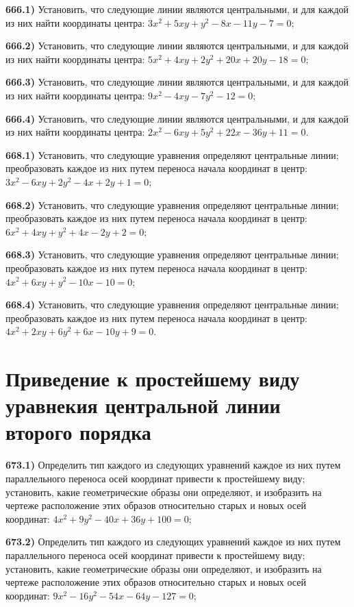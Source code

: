 \textbf{666.1)} Установить, что следующие линии являются центральными, и для каждой из них найти координаты центра: $3 x^2+5 x y+y^2-8 x-11 y-7=0$;

\textbf{666.2)} Установить, что следующие линии являются центральными, и для каждой из них найти координаты центра: $5 x^2+4 x y+2 y^2+20 x+20 y-18=0$;

\textbf{666.3)} Установить, что следующие линии являются центральными, и для каждой из них найти координаты центра: $9 x^2-4 x y-7 y^2-12=0$;

\textbf{666.4)} Установить, что следующие линии являются центральными, и для каждой из них найти координаты центра: $2 x^2-6 x y+5 y^2+22 x-36 y+11=0$.

\textbf{668.1)} Установить, что следующие уравнения определяют центральные линии; преобразовать каждое из них путем переноса начала координат в центр: $3 x^2-6 x y+2 y^2-4 x+2 y+1=0$;

\textbf{668.2)} Установить, что следующие уравнения определяют центральные линии; преобразовать каждое из них путем переноса начала координат в центр: $6 x^2+4 x y+y^2+4 x-2 y+2=0$;

\textbf{668.3)} Установить, что следующие уравнения определяют центральные линии; преобразовать каждое из них путем переноса начала координат в центр: $4 x^2+6 x y+y^2-10 x-10=0$;

\textbf{668.4)} Установить, что следующие уравнения определяют центральные линии; преобразовать каждое из них путем переноса начала координат в центр: $4 x^2+2 x y+6 y^2+6 x-10 y+9=0$.



\section{Приведение к простейшему виду уравнекия центральной линии второго порядка}



\textbf{673.1)} Определить тип каждого из следующих уравнений каждое из них путем параллельного переноса осей координат привести к простейшему виду; установить, какие геометрические образы они определяют, и изобразить на чертеже расположение этих образов относительно старых и новых осей координат: $4 x^2+9 y^2-40 x+36 y+100=0$;

\textbf{673.2)} Определить тип каждого из следующих уравнений каждое из них путем параллельного переноса осей координат привести к простейшему виду; установить, какие геометрические образы они определяют, и изобразить на чертеже расположение этих образов относительно старых и новых осей координат: $9 x^2-16 y^2-54 x-64 y-127=0$;

